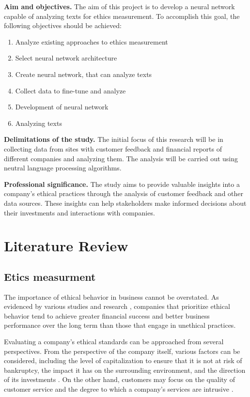 \documentclass[PI]{ProjectProposal}
\begin{document}
\textbf{Aim and objectives.} The aim of this project is to develop a neural network capable of analyzing texts for ethics measurement. To accomplish this goal, the following objectives should be achieved:
\begin{enumerate}
\item Analyze existing approaches to ethics measurement
\item Select neural network architecture
\item Create neural network, that can analyze texts
\item Collect data to fine-tune and analyze
\item Development of neural network
\item Analyzing texts
\end{enumerate}

\textbf{Delimitations of the study.} The initial focus of this research will be in collecting data from sites with customer feedback and financial reports of different companies and analyzing them. The analysis will be carried out using neutral language processing algorithms.

\textbf{Professional significance.} The study aims to provide valuable insights into a company's ethical practices through the analysis of customer feedback and other data sources. These insights can help stakeholders make informed decisions about their investments and interactions with companies.
\chapter{Literature Review}
\label{sec:org2f1c94d}
\section{Etics measurment}
\label{sec:orgabbb491}
The importance of ethical behavior in business cannot be overstated. As evidenced by various studies and research \autocites{climent_ethical_2018}[][]{mure_esg_2021}, companies that prioritize ethical behavior tend to achieve greater financial success and better business performance over the long term than those that engage in unethical practices.

Evaluating a company's ethical standards can be approached from several perspectives. From the perspective of the company itself, various factors can be considered, including the level of capitalization to ensure that it is not at risk of bankruptcy, the impact it has on the surrounding environment, and the direction of its investments \autocite{harvey1995ethical}. On the other hand, customers may focus on the quality of customer service \autocite{brunk2010exploring} and the degree to which a company's services are intrusive \autocite{mitchell1992bank}.
\end{document}
